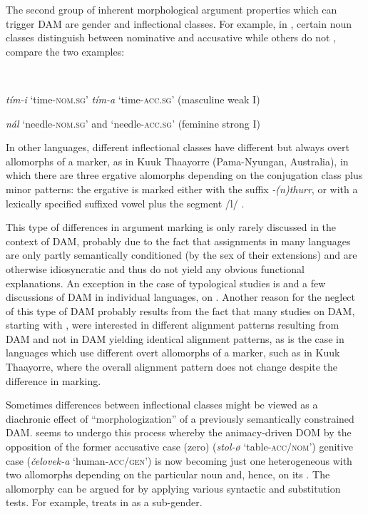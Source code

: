 \documentclass[output=paper]{LSP/langsci}
\begin{document}
The second group of inherent morphological argument properties which can trigger DAM are gender and inflectional classes. 
For example, in , certain noun classes distinguish between nominative and accusative while others do not \citep[153]{Thrinsson2002Germanic}, compare the two examples: 

\ea\label{01-wi-ex:7:Icelandic}
\\
\begin{xlist}
\ex \textit{tím-i} ‘time-\textsc{nom.sg}’ \vs \textit{tím-a} ‘time-\textsc{acc.sg}’ (masculine weak I)

\ex \textit{nál} ‘needle-\textsc{nom.sg}’ and ‘needle-\textsc{acc.sg}’ (feminine strong I)

\end{xlist}
\z

\noindent In other languages, different inflectional classes have different but always overt allomorphs of a marker, as \eg in Kuuk Thaayorre (Pama-Nyungan, Australia), in which there are three ergative alomorphs depending on the conjugation class plus minor patterns: the ergative is marked either with the suffix \textit{-(n)thurr}, or with a lexically specified suffixed vowel plus the segment /l/ \citep[158--163]{Gaby2006Grammar}.

This type of differences in argument marking is only rarely discussed in the context of DAM, probably due to the fact that  assignments in many languages are only partly semantically conditioned (\eg by the sex of their extensions) and are otherwise idiosyncratic and thus do not yield any obvious functional explanations. 
An exception in the case of typological studies is \citet{Bickeletal2015Typological} and a few discussions of DAM in individual languages, \eg \citet{Karatsareas2011Study} on . 
Another reason for the neglect of this type of DAM probably results from the fact that many studies on DAM, starting with \citet{Silverstein1976Hierarchy}, were interested in different alignment patterns resulting from DAM and not in DAM yielding identical alignment patterns, as is the case in languages which use different overt allomorphs of a marker, such as in Kuuk Thaayorre, where the overall alignment pattern does not change despite the difference in marking.

Sometimes differences between inflectional classes might be viewed as a diachronic effect of “morphologization” of a previously semantically constrained DAM. 
 seems to undergo this process whereby the animacy-driven DOM by the opposition of the former accusative case (zero) (\textit{stol-ø} ‘table-\textsc{acc/nom}’) \vs genitive case (\textit{čelovek-a} ‘human-\textsc{acc/gen}’) is now becoming just one heterogeneous  with two allomorphs depending on the particular noun and, hence, on its . 
The allomorphy can be argued for by applying various syntactic and substitution tests. 
For example, \citet[165--167]{Corbett1991Gender} treats  in  as a sub-gender.
\end{document}
